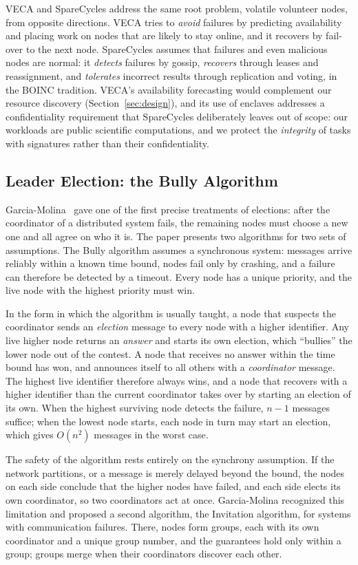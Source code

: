 VECA and SpareCycles address the same root problem, volatile volunteer nodes, from opposite directions. VECA tries to \emph{avoid} failures by predicting availability and placing work on nodes that are likely to stay online, and it recovers by fail-over to the next node. SpareCycles assumes that failures and even malicious nodes are normal: it \emph{detects} failures by gossip, \emph{recovers} through leases and reassignment, and \emph{tolerates} incorrect results through replication and voting, in the BOINC tradition. VECA's availability forecasting would complement our resource discovery (Section~\ref{sec:design}), and its use of enclaves addresses a confidentiality requirement that SpareCycles deliberately leaves out of scope: our workloads are public scientific computations, and we protect the \emph{integrity} of tasks with signatures rather than their confidentiality.

\subsection{Leader Election: the Bully Algorithm}
Garcia-Molina~\cite{garciamolina1982elections} gave one of the first precise treatments of elections: after the coordinator of a distributed system fails, the remaining nodes must choose a new one and all agree on who it is. The paper presents two algorithms for two sets of assumptions. The Bully algorithm assumes a synchronous system: messages arrive reliably within a known time bound, nodes fail only by crashing, and a failure can therefore be detected by a timeout. Every node has a unique priority, and the live node with the highest priority must win.

In the form in which the algorithm is usually taught, a node that suspects the coordinator sends an \textit{election} message to every node with a higher identifier. Any live higher node returns an \textit{answer} and starts its own election, which ``bullies'' the lower node out of the contest. A node that receives no answer within the time bound has won, and announces itself to all others with a \textit{coordinator} message. The highest live identifier therefore always wins, and a node that recovers with a higher identifier than the current coordinator takes over by starting an election of its own. When the highest surviving node detects the failure, $n-1$ messages suffice; when the lowest node starts, each node in turn may start an election, which gives $O(n^2)$ messages in the worst case.

The safety of the algorithm rests entirely on the synchrony assumption. If the network partitions, or a message is merely delayed beyond the bound, the nodes on each side conclude that the higher nodes have failed, and each side elects its own coordinator, so two coordinators act at once. Garcia-Molina recognized this limitation and proposed a second algorithm, the Invitation algorithm, for systems with communication failures. There, nodes form groups, each with its own coordinator and a unique group number, and the guarantees hold only within a group; groups merge when their coordinators discover each other.

